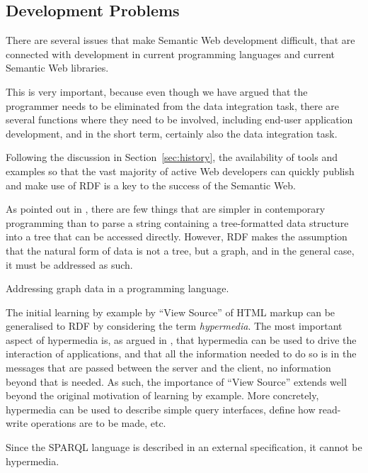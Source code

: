\subsection{Development Problems}\label{sec:devproblems}

There are several issues that make Semantic Web development difficult,
that are connected with development in current programming languages
and current Semantic Web libraries.

This is very important, because even though we have argued that the
programmer needs to be eliminated from the data integration task,
there are several functions where they need to be involved, including
end-user application development, and in the short term, certainly
also the data integration task. 

Following the discussion in Section~\ref{sec:history}, the
availability of tools and examples so that the vast majority of active
Web developers can quickly publish and make use of RDF is a key to the
success of the Semantic Web.

As pointed out in \cite{darobin1}, there are few things that are
simpler in contemporary programming than to parse a string containing
a tree-formatted data structure into a tree that can be accessed
directly. However, RDF makes the assumption that the natural form of
data is not a tree, but a graph, and in the general case, it must be
addressed as such.

\begin{problem}\label{prob:graph}
Addressing graph data in a programming language.
\end{problem}

The initial learning by example by ``View Source'' of HTML markup can
be generalised to RDF by considering the term \emph{hypermedia}. The
most important aspect of hypermedia is, as argued in
\cite{Fielding_2000_Architectural-Styles}, that hypermedia can be used
to drive the interaction of applications, and that all the information
needed to do so is in the messages that are passed between the server
and the client, no information beyond that is needed. As such, the
importance of ``View Source'' extends well beyond the original
motivation of learning by example. More concretely, hypermedia can be
used to describe simple query interfaces, define how read-write
operations are to be made, etc.

\begin{problem}\label{prob:tpf}
Since the SPARQL language is described in an external specification,
it cannot be hypermedia.
\end{problem}

